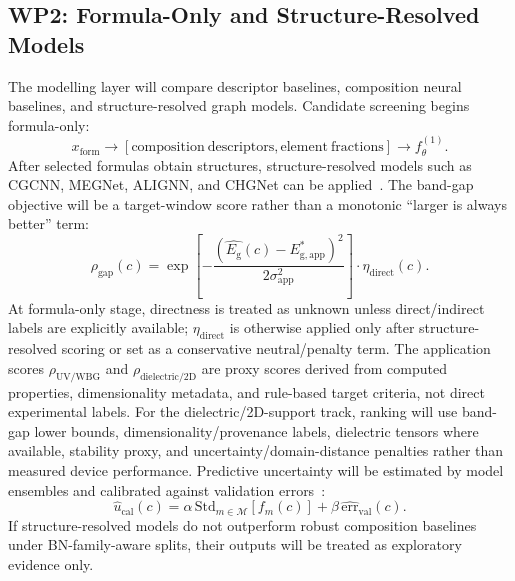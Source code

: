\documentclass[10pt,a4paper]{article}
\newcommand{\eg}{E_{\mathrm{g}}}
\newcommand{\form}{x_{\mathrm{form}}}
\newcommand{\unc}{u}
\newcommand{\gapscore}{\rho_{\mathrm{gap}}}
\newcommand{\uvscore}{\rho_{\mathrm{UV/WBG}}}
\newcommand{\dielscore}{\rho_{\mathrm{dielectric/2D}}}
\begin{document}
\subsection{WP2: Formula-Only and Structure-Resolved Models}
The modelling layer will compare descriptor baselines, composition neural baselines, and structure-resolved graph models. Candidate screening begins formula-only:
\[
  \form\rightarrow
  [\mathrm{composition\ descriptors},\mathrm{element\ fractions}]
  \rightarrow f_{\theta}^{(1)}.
\]
After selected formulas obtain structures, structure-resolved models such as CGCNN, MEGNet, ALIGNN, and CHGNet can be applied~\cite{xie2018_cgcnn,chen2019_megnet,choudhary2021_alignn,deng2023_chgnet}. The band-gap objective will be a target-window score rather than a monotonic ``larger is always better'' term:
  \[
    \gapscore(c)=
    \exp\!\left[-\frac{(\hat{\eg}(c)-E^*_{\mathrm{g,app}})^2}{2\sigma_{\mathrm{app}}^2}\right]
    \cdot \eta_{\mathrm{direct}}(c).
  \]
At formula-only stage, directness is treated as unknown unless direct/indirect labels are explicitly available; $\eta_{\mathrm{direct}}$ is otherwise applied only after structure-resolved scoring or set as a conservative neutral/penalty term. The application scores $\uvscore$ and $\dielscore$ are proxy scores derived from computed properties, dimensionality metadata, and rule-based target criteria, not direct experimental labels. For the dielectric/2D-support track, ranking will use band-gap lower bounds, dimensionality/provenance labels, dielectric tensors where available, stability proxy, and uncertainty/domain-distance penalties rather than measured device performance. Predictive uncertainty will be estimated by model ensembles and calibrated against validation errors~\cite{gal2016_dropout,lakshminarayanan2017_ensembles}:
\[
  \hat{\unc}_{\mathrm{cal}}(c)=
  \alpha\,\mathrm{Std}_{m\in\mathcal{M}}[f_m(c)]
  +\beta\,\widehat{\mathrm{err}}_{\mathrm{val}}(c).
\]
If structure-resolved models do not outperform robust composition baselines under BN-family-aware splits, their outputs will be treated as exploratory evidence only.
\end{document}

